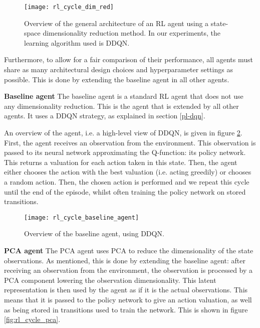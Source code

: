 \begin{figure}[h]
    \centering
    \texttt{[image: rl\_cycle\_dim\_red]}
    \caption{Overview of the general architecture of an RL agent using a state-space dimensionality reduction method. In our experiments, the learning algorithm used is DDQN.}
    \label{fig:rl_cycle_dim}
\end{figure}

Furthermore, to allow for a fair comparison of their performance, all agents must share as many architectural design choices and hyperparameter settings as possible. This is done by extending the baseline agent in all other agents. \newline

\noindent \textbf{Baseline agent}\newline
\noindent The baseline agent is a standard RL agent that does not use any dimensionality reduction. This is the agent that is extended by all other agents. It uses a DDQN strategy, as explained in section \ref{pl-dqn}. 

An overview of the agent, i.e. a high-level view of DDQN, is given in figure \ref{fig:rl_cycle_base}. First, the agent receives an observation from the environment. This observation is passed to its neural network approximating the Q-function: its policy network. This returns a valuation for each action taken in this state. Then, the agent either chooses the action with the best valuation (i.e. acting greedily) or chooses a random action. Then, the chosen action is performed and we repeat this cycle until the end of the episode, whilst often training the policy network on stored transitions. \newline

\begin{figure}[h]
    \centering
    \texttt{[image: rl\_cycle\_baseline\_agent]}
    \caption{Overview of the baseline agent, using DDQN.}
    \label{fig:rl_cycle_base}
\end{figure}

\noindent \textbf{PCA agent}\newline
\noindent The PCA agent uses PCA to reduce the dimensionality of the state observations. As mentioned, this is done by extending the baseline agent: after receiving an observation from the environment, the observation is processed by a PCA component lowering the observation dimensionality. This latent representation is then used by the agent as if it is the actual observations. This means that it is passed to the policy network to give an action valuation, as well as being stored in transitions used to train the network. This is shown in figure \ref{fig:rl_cycle_pca}.

